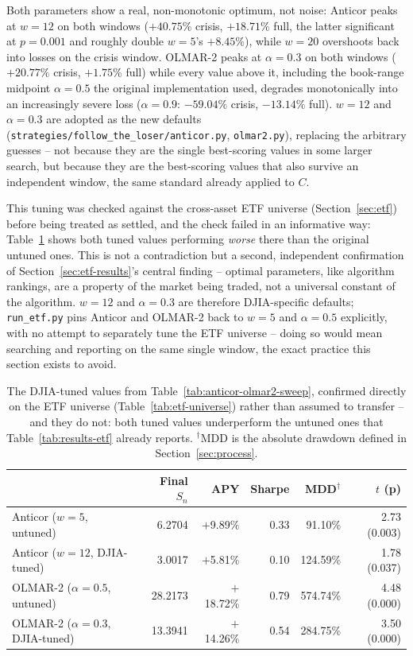 \documentclass[11pt]{article}
\begin{document}
Both parameters show a real, non-monotonic optimum, not noise: Anticor
peaks at $w=12$ on both windows ($+40.75\%$ crisis, $+18.71\%$ full,
the latter significant at $p=0.001$ and roughly double $w=5$'s
$+8.45\%$), while $w=20$ overshoots back into losses on the crisis
window. OLMAR-2 peaks at $\alpha=0.3$ on both windows ($+20.77\%$
crisis, $+1.75\%$ full) while every value above it, including the
book-range midpoint $\alpha=0.5$ the original implementation used,
degrades monotonically into an increasingly severe loss ($\alpha=0.9$:
$-59.04\%$ crisis, $-13.14\%$ full). $w=12$ and $\alpha=0.3$ are
adopted as the new defaults (\texttt{strategies/follow\_the\_loser/anticor.py},
\texttt{olmar2.py}), replacing the arbitrary guesses -- not because
they are the single best-scoring values in some larger search, but
because they are the best-scoring values that also survive an
independent window, the same standard already applied to $C$.

This tuning was checked against the cross-asset ETF universe
(Section~\ref{sec:etf}) before being treated as settled, and the check
failed in an informative way: Table~\ref{tab:anticor-olmar2-etf} shows
both tuned values performing \emph{worse} there than the original
untuned ones. This is not a contradiction but a second, independent
confirmation of Section~\ref{sec:etf-results}'s central finding --
optimal parameters, like algorithm rankings, are a property of the
market being traded, not a universal constant of the algorithm. $w=12$
and $\alpha=0.3$ are therefore DJIA-specific defaults; \texttt{run\_etf.py}
pins Anticor and OLMAR-2 back to $w=5$ and $\alpha=0.5$ explicitly,
with no attempt to separately tune the ETF universe -- doing so would
mean searching and reporting on the same single window, the exact
practice this section exists to avoid.

\begin{table}[h]
\centering
\begin{tabular}{lrrrrr}
\toprule
& Final $S_n$ & APY & Sharpe & MDD$^\dagger$ & $t$ (p) \\
\midrule
Anticor ($w{=}5$, untuned) & 6.2704 & $+$9.89\%  & 0.33 &  91.10\% & 2.73 (0.003) \\
Anticor ($w{=}12$, DJIA-tuned) & 3.0017 & $+$5.81\%  & 0.10 & 124.59\% & 1.78 (0.037) \\
OLMAR-2 ($\alpha{=}0.5$, untuned) & 28.2173 & $+$18.72\% & 0.79 & 574.74\% & 4.48 (0.000) \\
OLMAR-2 ($\alpha{=}0.3$, DJIA-tuned) & 13.3941 & $+$14.26\% & 0.54 & 284.75\% & 3.50 (0.000) \\
\bottomrule
\end{tabular}
\caption{The DJIA-tuned values from Table~\ref{tab:anticor-olmar2-sweep},
confirmed directly on the ETF universe (Table~\ref{tab:etf-universe})
rather than assumed to transfer -- and they do not: both tuned values
underperform the untuned ones that Table~\ref{tab:results-etf} already
reports. $^\dagger$MDD is the absolute drawdown defined in
Section~\ref{sec:process}.}
\label{tab:anticor-olmar2-etf}
\end{table}
\end{document}

